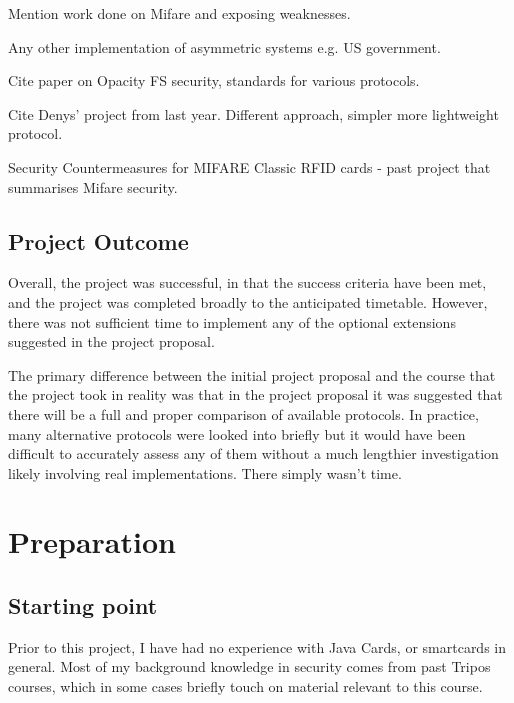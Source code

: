\documentclass[12pt,a4paper]{article}
\begin{document}
Mention work done on Mifare and exposing weaknesses.

Any other implementation of asymmetric systems e.g. US government.



Cite paper on Opacity FS security, standards for various protocols.

Cite Denys' project from last year. Different approach, simpler more lightweight protocol.

Security Countermeasures for MIFARE Classic RFID cards - past project that summarises Mifare security.


\subsection{Project Outcome}
Overall, the project was successful, in that the success criteria have been met, and the project was completed broadly to the anticipated timetable. However, there was not sufficient time to implement any of the optional extensions suggested in the project proposal.

The primary difference between the initial project proposal and the course that the project took in reality was that in the project proposal it was suggested that there will be a full and proper comparison of available protocols. In practice, many alternative protocols were looked into briefly but it would have been difficult to  accurately assess any of them without a much lengthier investigation likely involving real implementations. There simply wasn't time.





\pagebreak
\section{Preparation}

\subsection{Starting point}
Prior to this project, I have had no experience with Java Cards, or smartcards in general. Most of my background knowledge in security comes from past Tripos courses, which in some cases briefly touch on material relevant to this course.
\end{document}

